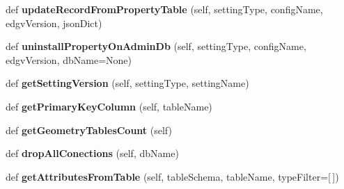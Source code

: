 \begin{DoxyCompactItemize}
def {\bfseries update\+Record\+From\+Property\+Table} (self, setting\+Type, config\+Name, edgv\+Version, json\+Dict)
\item 
\mbox{\label{class_dsg_tools_1_1_factories_1_1_sql_factory_1_1postgis_sql_generator_1_1_post_g_i_s_sql_generator_a3c890317b38674c47528a0a1f7b1d02d}} 
def {\bfseries uninstall\+Property\+On\+Admin\+Db} (self, setting\+Type, config\+Name, edgv\+Version, db\+Name=None)
\item 
\mbox{\label{class_dsg_tools_1_1_factories_1_1_sql_factory_1_1postgis_sql_generator_1_1_post_g_i_s_sql_generator_a058a116b64951125cc037808496c9e56}} 
def {\bfseries get\+Setting\+Version} (self, setting\+Type, setting\+Name)
\item 
\mbox{\label{class_dsg_tools_1_1_factories_1_1_sql_factory_1_1postgis_sql_generator_1_1_post_g_i_s_sql_generator_a23b8f264f0d548426e2908949b0e63eb}} 
def {\bfseries get\+Primary\+Key\+Column} (self, table\+Name)
\item 
\mbox{\label{class_dsg_tools_1_1_factories_1_1_sql_factory_1_1postgis_sql_generator_1_1_post_g_i_s_sql_generator_a5899b84648d22a266e8cb460b1a2ebf4}} 
def {\bfseries get\+Geometry\+Tables\+Count} (self)
\item 
\mbox{\label{class_dsg_tools_1_1_factories_1_1_sql_factory_1_1postgis_sql_generator_1_1_post_g_i_s_sql_generator_a94a1265185bbcaad3d6b8eba09624374}} 
def {\bfseries drop\+All\+Conections} (self, db\+Name)
\item 
\mbox{\label{class_dsg_tools_1_1_factories_1_1_sql_factory_1_1postgis_sql_generator_1_1_post_g_i_s_sql_generator_ad34cf671fa18eea7d18444270b103607}} 
def {\bfseries get\+Attributes\+From\+Table} (self, table\+Schema, table\+Name, type\+Filter=\mbox{[}$\,$\mbox{]})

\end{DoxyCompactItemize}
